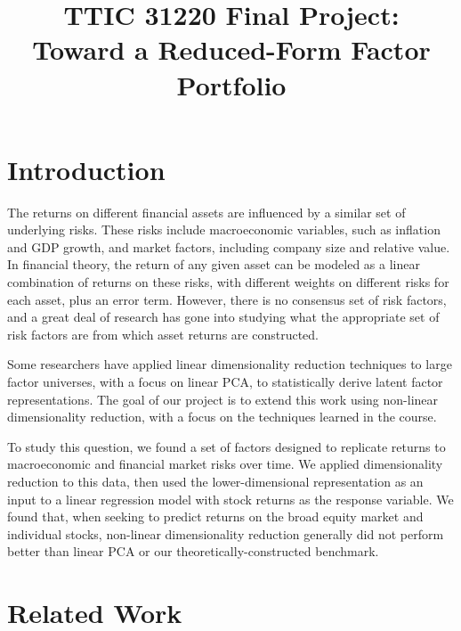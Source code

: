 \documentclass[a4paper]{article}
\title{TTIC 31220 Final Project: \\ Toward a Reduced-Form Factor Portfolio}
\begin{document}
  \maketitle

  \section{Introduction}

    The returns on different financial assets are influenced by a similar set of underlying risks. These risks include macroeconomic variables, such as inflation and GDP growth, and market factors, including company size and relative value. In financial theory, the return of any given asset can be modeled as a linear combination of returns on these risks, with different weights on different risks for each asset, plus an error term. However, there is no consensus set of risk factors, and a great deal of research has gone into studying what the appropriate set of risk factors are from which asset returns are constructed.
    \par Some researchers have applied linear dimensionality reduction techniques to large factor universes, with a focus on linear PCA, to statistically derive latent factor representations. The goal of our project is to extend this work using non-linear dimensionality reduction, with a focus on the techniques learned in the course. 
    \par To study this question, we found a set of factors designed to replicate returns to macroeconomic and financial market risks over time. We applied dimensionality reduction to this data, then used the lower-dimensional representation as an input to a linear regression model with stock returns as the response variable. We found that, when seeking to predict returns on the broad equity market and individual stocks, non-linear dimensionality reduction generally did not perform better than linear PCA or our theoretically-constructed benchmark.

  
  \section{Related Work}
\end{document}
